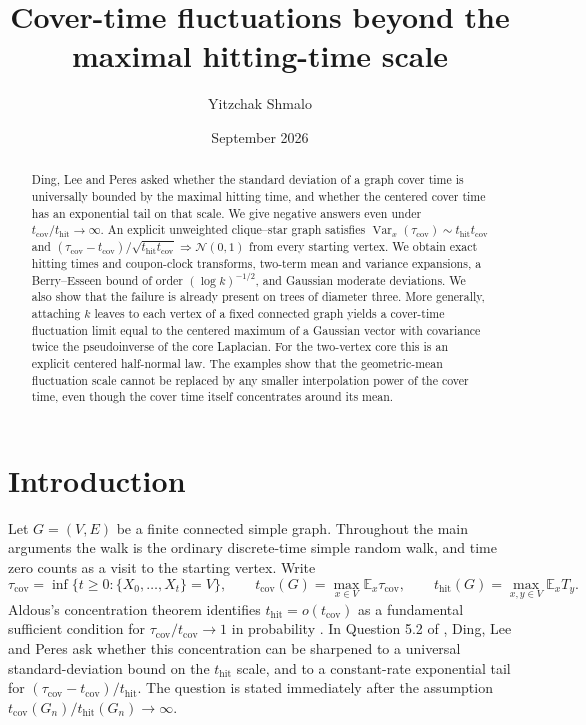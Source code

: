 \documentclass[11pt]{amsart}
\theoremstyle{remark}
\numberwithin{equation}{section}
\DeclareMathOperator{\Var}{Var}
\newcommand{\E}{\mathbb{E}}
\newcommand{\tcov}{t_{\mathrm{cov}}}
\newcommand{\thit}{t_{\mathrm{hit}}}
\newcommand{\taucov}{\tau_{\mathrm{cov}}}
\newcommand{\Nor}{\mathcal{N}}
\begin{document}
\title[Cover-time fluctuations beyond the hitting-time scale]{Cover-time fluctuations beyond the maximal hitting-time scale}
\author{Yitzchak Shmalo}
\address{Einstein Institute of Mathematics, The Hebrew University of Jerusalem, Jerusalem, Israel}
\date{September 2026}

\begin{abstract}
Ding, Lee and Peres asked whether the standard deviation of a graph cover time is universally bounded by the maximal hitting time, and whether the centered cover time has an exponential tail on that scale. We give negative answers even under $\tcov/\thit\to\infty$. An explicit unweighted clique--star graph satisfies $\Var_x(\taucov)\sim\thit\tcov$ and $(\taucov-\tcov)/\sqrt{\thit\tcov}\Longrightarrow\Nor(0,1)$ from every starting vertex. We obtain exact hitting times and coupon-clock transforms, two-term mean and variance expansions, a Berry--Esseen bound of order $(\log k)^{-1/2}$, and Gaussian moderate deviations. We also show that the failure is already present on trees of diameter three. More generally, attaching $k$ leaves to each vertex of a fixed connected graph yields a cover-time fluctuation limit equal to the centered maximum of a Gaussian vector with covariance twice the pseudoinverse of the core Laplacian. For the two-vertex core this is an explicit centered half-normal law. The examples show that the geometric-mean fluctuation scale cannot be replaced by any smaller interpolation power of the cover time, even though the cover time itself concentrates around its mean.
\end{abstract}

\maketitle

\tableofcontents

\section{Introduction}

Let $G=(V,E)$ be a finite connected simple graph. Throughout the main arguments the walk is the ordinary discrete-time simple random walk, and time zero counts as a visit to the starting vertex. Write
\[
\taucov=\inf\{t\ge 0:\{X_0,\dots,X_t\}=V\},\qquad \tcov(G)=\max_{x\in V}\E_x\taucov,\qquad \thit(G)=\max_{x,y\in V}\E_xT_y.
\]
Aldous's concentration theorem identifies $\thit=o(\tcov)$ as a fundamental sufficient condition for $\taucov/\tcov\to 1$ in probability \cite{Aldous91}. In Question 5.2 of \cite{DLP12}, Ding, Lee and Peres ask whether this concentration can be sharpened to a universal standard-deviation bound on the $\thit$ scale, and to a constant-rate exponential tail for $(\taucov-\tcov)/\thit$. The question is stated immediately after the assumption $\tcov(G_n)/\thit(G_n)\to\infty$.
\end{document}
